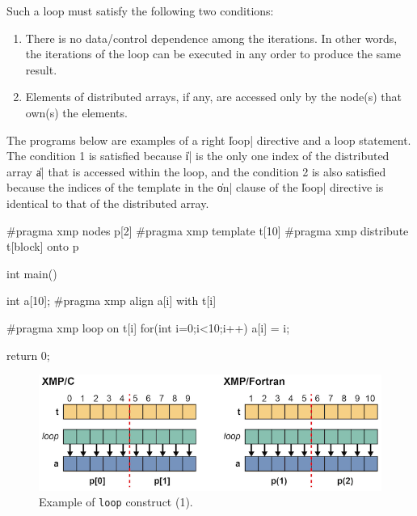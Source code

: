 Such a loop must satisfy the following two conditions:

\begin{enumerate}
  \item There is no data/control dependence among the iterations. In other
		words, the iterations of the loop can be executed in any order to
		produce the same result.
  \item Elements of distributed arrays, if any, are accessed only by the
		node(s) that own(s) the elements.
\end{enumerate}


The programs below are examples of a right \|loop| directive and a loop
statement.
%
The condition 1 is satisfied because \|i| is the only one index
of the distributed array \|a| that is accessed within the loop,
%
and the condition 2 is also satisfied because the indices of the
template in the \|on| clause of the \|loop| directive is identical to that
of the distributed array.

\begin{XCexample}
#pragma xmp nodes p[2]
#pragma xmp template t[10]
#pragma xmp distribute t[block] onto p

int main(){
  int a[10];
#pragma xmp align a[i] with t[i]

#pragma xmp loop on t[i]
  for(int i=0;i<10;i++)
    a[i] = i;

  return 0;
}
\end{XCexample}


\begin{figure}
  \centering
  \includegraphics[width=\textwidth]{figs/loop1.png}
  \caption{Example of {\tt loop} construct (1).}
\end{figure}

